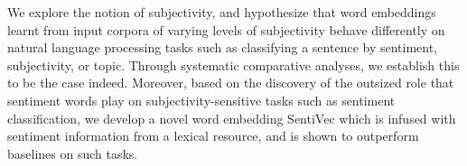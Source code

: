 We explore the notion of subjectivity, and hypothesize that word embeddings learnt from input corpora of varying levels of subjectivity behave differently on natural language processing tasks such as classifying a sentence by sentiment, subjectivity, or topic. Through systematic comparative analyses, we establish this to be the case indeed. Moreover, based on the discovery of the outsized role that sentiment words play on subjectivity-sensitive tasks such as sentiment classification, we develop a novel word embedding SentiVec which is infused with sentiment information from a lexical resource, and is shown to outperform baselines on such tasks.
